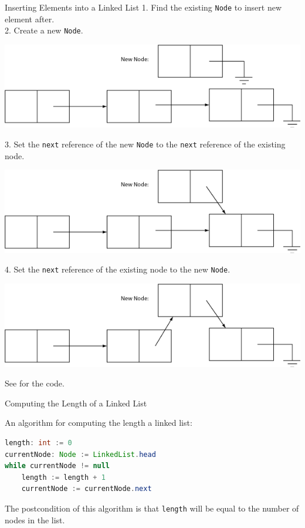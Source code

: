 \documentclass{beamer}
\begin{document}
\begin{frame}[fragile]{Inserting Elements into a Linked List}
\vspace{-.1in}
1. Find the existing {\tt Node} to insert new element after.\\
2. Create a new {\tt Node}.
\vspace{-.2in}
\begin{center}
\includegraphics[height=.7in]{insert-linked-list-1.png}
\end{center}

\vspace{-.05in}
3. Set the {\tt next} reference of the new {\tt Node} to the {\tt next} reference of the existing node.
\vspace{-.2in}
\begin{center}
\includegraphics[height=.7in]{insert-linked-list-2.png}
\end{center}

\vspace{-.05in}
4. Set the {\tt next} reference of the existing node to the new {\tt Node}.
\begin{center}
\vspace{-.05in}
\includegraphics[height=.7in]{insert-linked-list-3.png}
\end{center}

See  for the code.

\end{frame}

\begin{frame}[fragile]{Computing the Length of a Linked List}


An algorithm for computing the length a linked list:
\begin{lstlisting}[language=Java]
length: int := 0
currentNode: Node := LinkedList.head
while currentNode != null
    length := length + 1
    currentNode := currentNode.next
\end{lstlisting}

The postcondition of this algorithm is that {\tt length} will be equal to the number of nodes in the list.


\end{frame}
\end{document}
